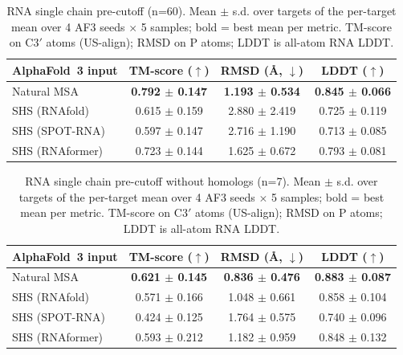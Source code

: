 \begin{table}[htbp]
\centering
\caption{RNA single chain pre-cutoff (n=60). Mean $\pm$ s.d. over targets of the per-target mean over 4 AF3 seeds $\times$ 5 samples; bold = best mean per metric. TM-score on C3$'$ atoms (US-align); RMSD on P atoms; LDDT is all-atom RNA LDDT.}
\label{tab:rna_single_chain_pre_cutoff}
\begin{tabular}{lccc}
\toprule
AlphaFold~3 input & TM-score ($\uparrow$) & RMSD (\AA, $\downarrow$) & LDDT ($\uparrow$) \\
\midrule
Natural MSA & \textbf{0.792 $\pm$ 0.147} & \textbf{1.193 $\pm$ 0.534} & \textbf{0.845 $\pm$ 0.066} \\
SHS (RNAfold) & 0.615 $\pm$ 0.159 & 2.880 $\pm$ 2.419 & 0.725 $\pm$ 0.119 \\
SHS (SPOT-RNA) & 0.597 $\pm$ 0.147 & 2.716 $\pm$ 1.190 & 0.713 $\pm$ 0.085 \\
SHS (RNAformer) & 0.723 $\pm$ 0.144 & 1.625 $\pm$ 0.672 & 0.793 $\pm$ 0.081 \\
\bottomrule
\end{tabular}
\end{table}

\begin{table}[htbp]
\centering
\caption{RNA single chain pre-cutoff without homologs (n=7). Mean $\pm$ s.d. over targets of the per-target mean over 4 AF3 seeds $\times$ 5 samples; bold = best mean per metric. TM-score on C3$'$ atoms (US-align); RMSD on P atoms; LDDT is all-atom RNA LDDT.}
\label{tab:rna_single_chain_pre_cutoff_without_homologs}
\begin{tabular}{lccc}
\toprule
AlphaFold~3 input & TM-score ($\uparrow$) & RMSD (\AA, $\downarrow$) & LDDT ($\uparrow$) \\
\midrule
Natural MSA & \textbf{0.621 $\pm$ 0.145} & \textbf{0.836 $\pm$ 0.476} & \textbf{0.883 $\pm$ 0.087} \\
SHS (RNAfold) & 0.571 $\pm$ 0.166 & 1.048 $\pm$ 0.661 & 0.858 $\pm$ 0.104 \\
SHS (SPOT-RNA) & 0.424 $\pm$ 0.125 & 1.764 $\pm$ 0.575 & 0.740 $\pm$ 0.096 \\
SHS (RNAformer) & 0.593 $\pm$ 0.212 & 1.182 $\pm$ 0.959 & 0.848 $\pm$ 0.132 \\
\bottomrule
\end{tabular}
\end{table}

